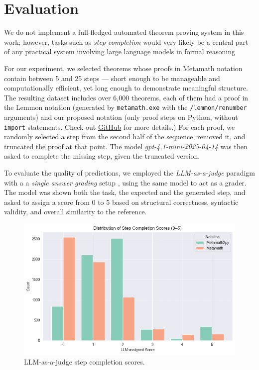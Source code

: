 \section{Evaluation}

\hspace{\parindent}
 We do not implement a full-fledged automated theorem proving system in this work; however, tasks such as
\textit{step completion} would very likely be a central part of any practical system involving large language models
in formal reasoning \cite{proofwaala}


For our experiment, we selected theorems whose proofs in Metamath notation contain between 5 and 25 steps — short
enough to be manageable and computationally efficient, yet long enough to demonstrate meaningful structure. The
resulting dataset includes over 6,000 theorems, each of them had a proof in the Lemmon notation (generated by
\texttt{metamath.exe} with the \texttt{/lemmon/renumber} arguments) and our proposed notation (only proof steps on
Python,
without \texttt{import} statements. Check out \href{https://github.com/kamushekp/metamath2py}{GitHub} for more details.)
For each proof, we randomly selected a step from the second half of
the sequence, removed it, and truncated the proof at that point. The model \textit{gpt-4.1-mini-2025-04-14} was then asked to complete the missing step, given the truncated version.


To evaluate the quality of predictions, we employed the \textit{LLM-as-a-judge} paradigm with a a
\textit{single answer grading} setup \cite{llmjudge}, using the same
model to act as a grader. The model was shown both the task, the expected and the generated
step, and asked to assign a score from 0 to 5 based on structural correctness, syntactic validity, and overall
similarity to the reference.

\begin{figure}[h]
  \centering
  \includegraphics[scale=0.5]{step_completion_score.png}
  \caption{LLM-as-a-judge step completion scores.}
  \label{fig:fig1}
\end{figure}

